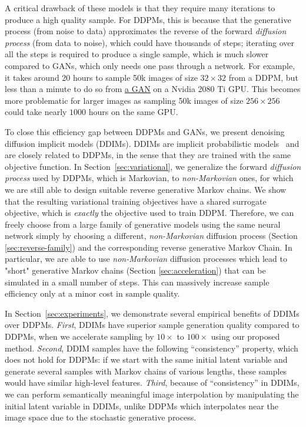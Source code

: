A critical drawback of these models is that they require many iterations to produce a high quality sample. For DDPMs, this is because that the generative process (from noise to data) approximates the reverse of the forward \textit{diffusion process} (from data to noise), which could have thousands of steps; iterating over all the steps is required to produce a single sample, which is much slower compared to GANs, which only needs one pass through a network. For example, it takes around 20 hours to sample 50k images of size $32 \times 32$ from a DDPM, but less than a minute to do so from \href{https://github.com/ajbrock/BigGAN-PyTorch}{\underline{a GAN}} on a Nvidia 2080 Ti GPU. This becomes more problematic for larger images as sampling 50k images of size $256 \times 256$ could take nearly $1000$ hours on the same GPU.

To close this efficiency gap between DDPMs and GANs, we present denoising diffusion implicit models (DDIMs). DDIMs are implicit probabilistic models~\citep{mohamed2016learning} and are closely related to DDPMs, in the sense that they are trained with the same objective function. In Section~\ref{sec:variational}, 
we generalize the forward \textit{diffusion process} used by DDPMs, which is Markovian, to \textit{non-Markovian} ones, for which we are still able to design suitable reverse generative Markov chains. We show that the resulting variational training objectives have a shared surrogate objective, which is \textit{exactly} the objective used to train DDPM. Therefore, we can freely choose from a large family of generative models using the same neural network simply by choosing a different, \textit{non-Markovian} diffusion process (Section \ref{sec:reverse-family}) and the corresponding reverse generative Markov Chain. In particular, we are able to use \textit{non-Markovian} diffusion processes which lead to "short" generative Markov chains (Section \ref{sec:acceleration}) that can be simulated in a small number of steps. This can massively increase sample efficiency only at a minor cost in sample quality. 

In Section~\ref{sec:experiments}, we demonstrate several empirical benefits of DDIMs over DDPMs. \textit{First}, DDIMs have superior sample generation quality compared to DDPMs, when we accelerate sampling by $10\times$ to $100\times$ using our proposed method. 
\textit{Second}, DDIM samples have the following ``consistency'' property, which does not hold for DDPMs: if we start with the same initial latent variable and generate several samples with Markov chains of various lengths, these samples would have similar high-level features. 
\textit{Third}, because of ``consistency'' in DDIMs, we can perform semantically meaningful image interpolation by manipulating the initial latent variable in DDIMs, unlike DDPMs which interpolates near the image space due to the stochastic generative process.

